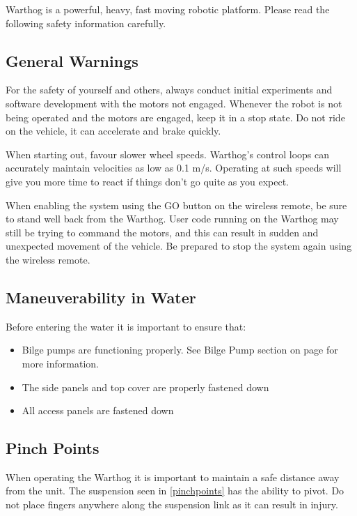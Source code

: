 \documentclass[]{clearpath-latex/clearpath-manual}
\begin{document}
Warthog is a powerful, heavy, fast moving robotic platform. Please read the following safety information carefully.

\subsection{General Warnings}

For the safety of yourself and others, always conduct initial experiments and software development with the motors not engaged.  Whenever the robot is not being operated and the motors are engaged, keep it in a stop state.  Do not ride on the vehicle, it can accelerate and brake quickly.

When starting out, favour slower wheel speeds. Warthog's control loops can accurately maintain velocities as low as 0.1 m/s. Operating at such speeds will give you more time to react if things don’t go quite as you expect.

When enabling the system using the GO button on the wireless remote, be sure to stand well back from the Warthog. User code running on the Warthog may still be trying to command the motors, and this can result in sudden and unexpected movement of the vehicle. Be prepared to stop the system again using the wireless remote.


\subsection{Maneuverability in Water}

Before entering the water it is important to ensure that:

\begin{itemize}[nolistsep]
  \item Bilge pumps are functioning properly.  See Bilge Pump section on page \pageref{bilgepumps} for more information.
  \item The side panels and top cover are properly fastened down
  \item All access panels are fastened down
\end{itemize}


\subsection{Pinch Points}

When operating the Warthog  it is important to maintain a safe distance away from the unit. The suspension seen in \autoref{pinchpoints} has the ability to pivot.  Do not place fingers anywhere along the suspension link as it can result in injury.
\end{document}
